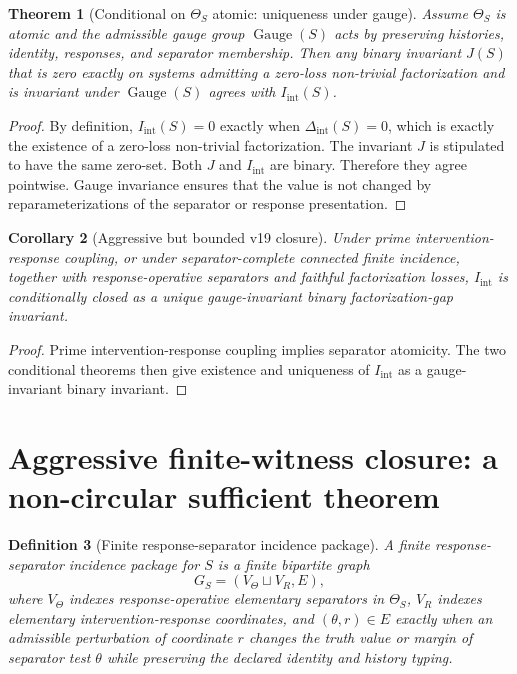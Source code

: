 \documentclass[11pt]{article}
\newtheorem{definition}{Definition}[section]
\newtheorem{theorem}[definition]{Theorem}
\newtheorem{corollary}[definition]{Corollary}
\newcommand{\QGauge}{\operatorname{Gauge}}
\newcommand{\Iint}{I_{\mathrm{int}}}
\begin{document}
\begin{theorem}[Conditional on $\Theta_S$ atomic: uniqueness under gauge]
Assume $\Theta_S$ is atomic and the admissible gauge group $\QGauge(S)$ acts by preserving histories, identity, responses, and separator membership. Then any binary invariant $J(S)$ that is zero exactly on systems admitting a zero-loss non-trivial factorization and is invariant under $\QGauge(S)$ agrees with $\Iint(S)$.
\end{theorem}

\begin{proof}
By definition, $\Iint(S)=0$ exactly when $\Delta_{\mathrm{int}}(S)=0$, which is exactly the existence of a zero-loss non-trivial factorization. The invariant $J$ is stipulated to have the same zero-set. Both $J$ and $\Iint$ are binary. Therefore they agree pointwise. Gauge invariance ensures that the value is not changed by reparameterizations of the separator or response presentation.
\end{proof}

\begin{corollary}[Aggressive but bounded v19 closure]
Under prime intervention-response coupling, or under separator-complete connected finite incidence, together with response-operative separators and faithful factorization losses, $\Iint$ is conditionally closed as a unique gauge-invariant binary factorization-gap invariant.
\end{corollary}

\begin{proof}
Prime intervention-response coupling implies separator atomicity. The two conditional theorems then give existence and uniqueness of $\Iint$ as a gauge-invariant binary invariant.
\end{proof}


\section{Aggressive finite-witness closure: a non-circular sufficient theorem}

\begin{definition}[Finite response-separator incidence package]
A finite response-separator incidence package for $S$ is a finite bipartite graph
\[
  G_S=(V_\Theta\sqcup V_R,E),
\]
where $V_\Theta$ indexes response-operative elementary separators in $\Theta_S$, $V_R$ indexes elementary intervention-response coordinates, and $(\theta,r)\in E$ exactly when an admissible perturbation of coordinate $r$ changes the truth value or margin of separator test $\theta$ while preserving the declared identity and history typing.
\end{definition}
\end{document}
